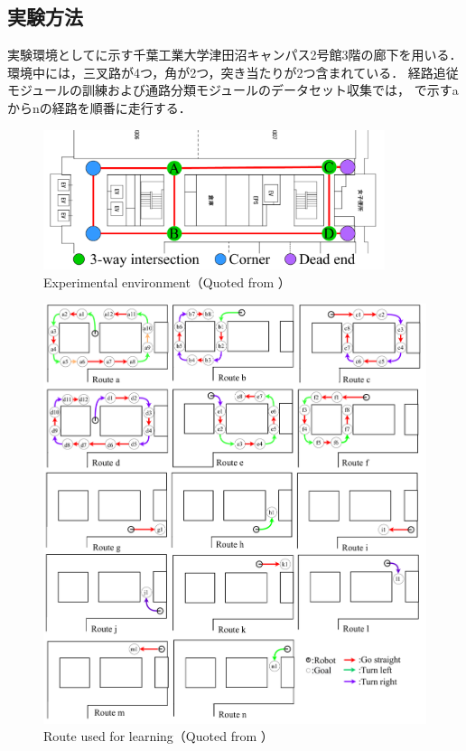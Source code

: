 \subsection{実験方法}
実験環境としてに示す千葉工業大学津田沼キャンパス2号館3階の廊下を用いる．
環境中には，三叉路が4つ，角が2つ，突き当たりが2つ含まれている．
経路追従モジュールの訓練および通路分類モジュールのデータセット収集では，
で示すaからnの経路を順番に走行する．
\begin{figure}[htbp]
    \centering
     \includegraphics[width=100mm]{images/pdf/cit3f.pdf}
     \caption[Experimental environment]{Experimental environment（Quoted from \cite{haruyama2023}）}\label{fig:cit3f}
\end{figure}
\begin{figure}[htbp]
    \centering
     \includegraphics[width=130mm]{images/pdf/si_route.pdf}
     \caption[Route used for learning]{Route used for learning（Quoted from \cite{haruyama2023}）}\label{fig:newroute}
\end{figure}


